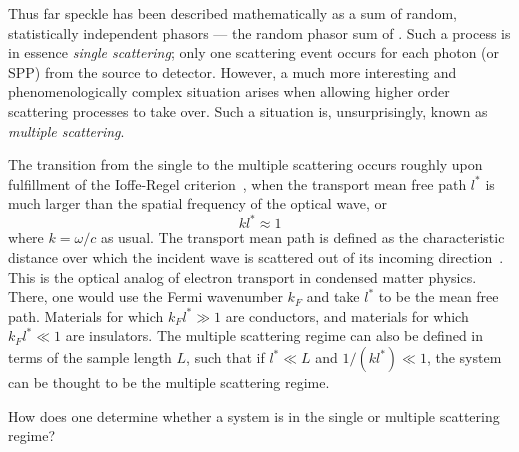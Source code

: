Thus far speckle has been described mathematically as a sum of random,
statistically independent phasors --- the random phasor sum of
.  Such a process is in essence \textit{single
scattering}; only one scattering event occurs for each photon (or SPP) from
the source to detector.  However, a much more interesting and
phenomenologically complex situation arises when allowing higher order
scattering processes to take over.  Such a situation is, unsurprisingly, known
as \textit{multiple scattering}.

The transition from the single to the multiple scattering occurs roughly upon
fulfillment of the Ioffe-Regel criterion~\cite{ioffe1960non}, when the
transport mean free path $l^*$ is much larger than the spatial frequency of
the optical wave, or
\begin{equation}
k l^* \approx 1
\end{equation}
where $k=\omega/c$ as usual.  The transport mean path is defined as the
characteristic distance over which the incident wave is scattered out of
its incoming direction~\cite{berkovits1994correlations}.  This is the
optical analog of electron transport in condensed matter physics.  There,
one would use the Fermi wavenumber $k_F$ and take $l^*$ to be the mean free
path.  Materials for which $k_F l^* \gg 1$ are conductors, and materials
for which $k_F l^* \ll 1$ are insulators.  The multiple scattering regime can
also be defined in terms of the sample length $L$, such that if
$l^* \ll L$ and $1/(k l^*) \ll 1$, the system can be thought to be the
multiple scattering regime.  

How does one determine whether a system is in the single or multiple
scattering regime?
